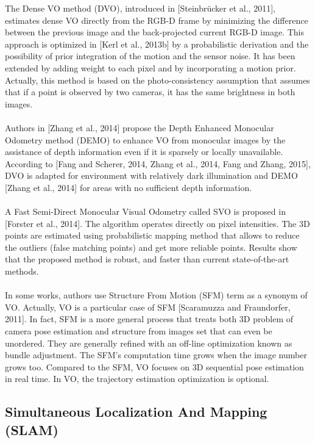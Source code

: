 \documentclass[11pt,openany]{book}
\begin{document}
The Dense VO method (DVO), introduced in [Steinbrücker et al., 2011], estimates dense
VO directly from the RGB-D frame by minimizing the diﬀerence between the previous
image and the back-projected current RGB-D image. This approach is optimized in [Kerl
        et al., 2013b] by a probabilistic derivation and the possibility of prior integration of the
motion and the sensor noise. It has been extended by adding weight to each pixel and by incorporating a motion prior. Actually, this method is based on the photo-consistency
assumption that assumes that if a point is observed by two cameras, it has the same
brightness in both images.\\\\
Authors in [Zhang et al., 2014] propose the Depth Enhanced Monocular Odometry method
(DEMO) to enhance VO from monocular images by the assistance of depth information
even if it is sparsely or locally unavailable. According to [Fang and Scherer, 2014, Zhang
        et al., 2014, Fang and Zhang, 2015], DVO is adapted for environment with relatively dark
illumination and DEMO [Zhang et al., 2014] for areas with no suﬃcient depth information.\\\\
A Fast Semi-Direct Monocular Visual Odometry called SVO is proposed in [Forster et al.,
        2014]. The algorithm operates directly on pixel intensities. The 3D points are estimated
using probabilistic mapping method that allows to reduce the outliers (false matching
points) and get more reliable points. Results show that the proposed method is robust,
and faster than current state-of-the-art methods.\\\\
In some works, authors use Structure From Motion (SFM) term as a synonym of VO.
Actually, VO is a particular case of SFM [Scaramuzza and Fraundorfer, 2011]. In fact,
SFM is a more general process that treats both 3D problem of camera pose estimation and
structure from images set that can even be unordered. They are generally reﬁned with an
oﬀ-line optimization known as bundle adjustment. The SFM’s computation time grows
when the image number grows too. Compared to the SFM, VO focuses on 3D sequential
pose estimation in real time. In VO, the trajectory estimation optimization is optional.
\subsection{Simultaneous Localization And Mapping (SLAM)}
\end{document}
